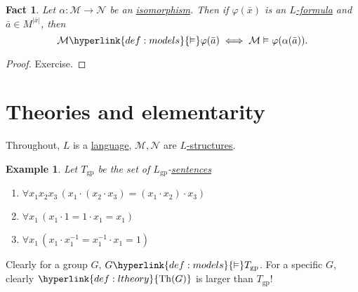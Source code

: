 \documentclass{article}
\let\models\vDash
\DeclareMathOperator{\Mod}{Mod}
\DeclareMathOperator{\Th}{Th}
\newtheorem{nexample}[nthm]{Example}
\newtheorem{nfact}[nthm]{Fact}
\newcommand{\named}[1]{\textbf{#1}\index{#1}}
\begin{document}
\begin{nfact}\label{fact:2.12}
  Let $\alpha: \mathcal{M} \to \mathcal{N}$ be an \hyperlink{def:iso}{isomorphism}.
  Then if $\varphi(\bar{x})$ is an \hyperlink{def:form}{$L$-formula} and $\bar{a} \in M^{|\bar{x}|}$, then
  \begin{equation*}
    \mathcal{M} \hyperlink{def:models}{\models} \varphi(\bar{a}) \iff \mathcal{M} \models \varphi(\alpha(\bar{a})).
  \end{equation*}
\end{nfact}
\begin{proof}
  Exercise.
\end{proof}

\clearpage
\section{Theories and elementarity}
Throughout, $L$ is a \hyperlink{def:lang}{language}, $\mathcal{M}, \mathcal{N}$ are \hyperlink{def:str}{$L$-structures}.
\begin{nexample}\label{eg:3.2}
  Let $T_{\text{gp}}$ be the set of \hyperlink{def:lgp}{$L_{\text{gp}}$}-\hyperlink{def:sentence}{sentences}
  \begin{enumerate}[label=(\roman*)]
    \item $\forall x_1 x_2 x_3\, (x_1 \cdot (x_2 \cdot x_3) = (x_1 \cdot x_2) \cdot x_3)$
    \item $\forall x_1\, (x_1 \cdot 1 = 1 \cdot x_1 = x_1)$
    \item $\forall x_1\,(x_1 \cdot x_1^{-1} = x_1^{-1} \cdot x_1 = 1)$
  \end{enumerate}
\end{nexample}
Clearly for a group $G$, $G \hyperlink{def:models}{\models} T_{\text{gp}}$. For a specific $G$, clearly $\hyperlink{def:ltheory}{\Th(G)}$ is larger than $T_{\text{gp}}$!
\end{document}
